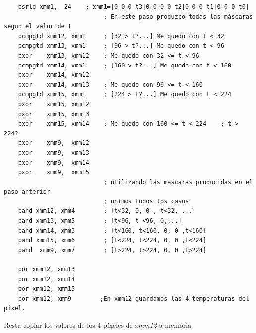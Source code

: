 \begin{codesnippet}
\begin{verbatim}				
    psrld xmm1,  24    ; xmm1=|0 0 0 t3|0 0 0 0 t2|0 0 0 t1|0 0 0 t0|
							; En este paso produzco todas las máscaras segun el valor de T
    pcmpgtd xmm12, xmm1     ; [32 > t?...] Me quedo con t < 32
    pcmpgtd xmm13, xmm1     ; [96 > t?...] Me quedo con t < 96
    pxor    xmm13, xmm12    ; Me quedo con 32 <= t < 96
    pcmpgtd xmm14, xmm1     ; [160 > t?...] Me quedo con t < 160
    pxor    xmm14, xmm12
    pxor    xmm14, xmm13    ; Me quedo con 96 <= t < 160
    pcmpgtd xmm15, xmm1     ; [224 > t?...] Me quedo con t < 224
    pxor    xmm15, xmm12
    pxor    xmm15, xmm13
    pxor    xmm15, xmm14    ; Me quedo con 160 <= t < 224    ; t > 224?
    pxor    xmm9,  xmm12
    pxor    xmm9,  xmm13
    pxor    xmm9,  xmm14
    pxor    xmm9,  xmm15
							; utilizando las mascaras producidas en el paso anterior 
							; unimos todos los casos
    pand xmm12, xmm4        ; [t<32, 0, 0 , t<32, ...]
    pand xmm13, xmm5        ; [t<96, t <96, 0,...]
    pand xmm14, xmm3        ; [t<160, t<160, 0, 0 ,t<160]
    pand xmm15, xmm6        ; [t<224, t<224, 0, 0 ,t<224]
    pand  xmm9, xmm7        ; [t>224, t>224, 0, 0 ,t>224]
													
    por xmm12, xmm13
    por xmm12, xmm14
    por xmm12, xmm15
    por xmm12, xmm9        ;En xmm12 guardamos las 4 temperaturas del pixel.
\end{verbatim}
\end{codesnippet}

Resta copiar los valores de los 4 píxeles de \emph{xmm12} a memoria.